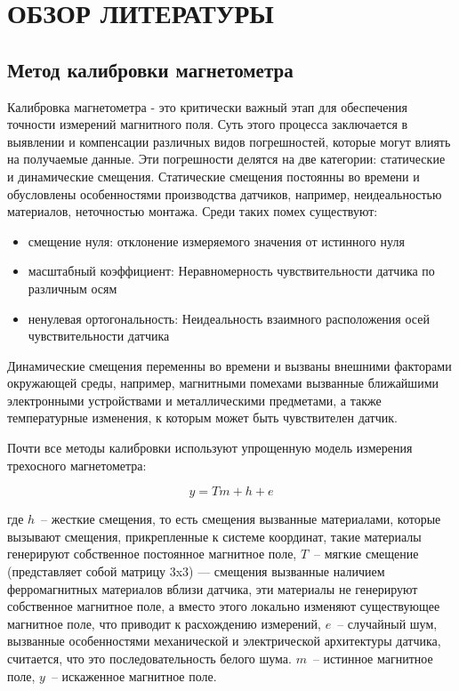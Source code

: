 \section{ОБЗОР ЛИТЕРАТУРЫ}
\label{sec:domain}

\subsection{Метод калибровки магнетометра}
Калибровка магнетометра - это критически важный этап для обеспечения точности измерений магнитного поля. 
Суть этого процесса заключается в выявлении и компенсации различных видов погрешностей, которые могут 
влиять на получаемые данные. Эти погрешности делятся на две категории: статические и динамические смещения.
Статические смещения постоянны во времени и обусловлены особенностями производства датчиков, например,
неидеальностью материалов, неточностью монтажа. Среди таких помех существуют: 
\begin{itemize}
    \item смещение нуля: отклонение измеряемого значения от истинного нуля
    \item масштабный коэффициент: Неравномерность чувствительности датчика по различным осям
    \item ненулевая ортогональность: Неидеальность взаимного расположения осей чувствительности датчика
\end{itemize}

Динамические смещения переменны во времени и вызваны внешними факторами окружающей среды, например, магнитными помехами
вызванные ближайшими электронными устройствами и металлическими предметами, 
а также температурные изменения, к которым может быть чувствителен датчик.

Почти все методы калибровки используют упрощенную модель измерения трехосного магнетометра:

$$ y = Tm+h+e$$

где $h$~-- жесткие смещения, то есть смещения вызванные материалами, которые вызывают смещения, прикрепленные к системе координат, 
такие материалы генерируют собственное  постоянное магнитное поле,
$T$~-- мягкие смещение (представляет собой матрицу 3x3) --- смещения вызванные наличием ферромагнитных материалов вблизи датчика,
эти материалы не генерируют собственное магнитное поле, а вместо этого локально изменяют существующее магнитное поле, что приводит к расхождению измерений,
$e$~-- случайный шум, вызванные особенностями механической и электрической архитектуры датчика, считается, что это последовательность белого шума.
$m$~-- истинное магнитное поле, $y$~-- искаженное магнитное поле.

